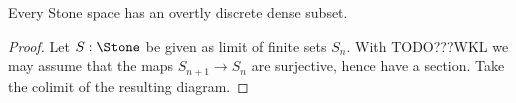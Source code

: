 \begin{lemma}
  Every Stone space has an overtly discrete dense subset. 
\end{lemma}
\begin{proof}
  Let $S:\Stone$ be given as limit of finite sets $S_n$. With TODO???WKL we may assume that the maps $S_{n+1} \to S_n$ are surjective, hence have a section. Take the colimit of the resulting diagram. 
\end{proof}
